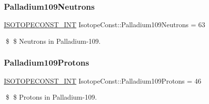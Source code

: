 \subsubsection{\texorpdfstring{Palladium109\+Neutrons}{Palladium109Neutrons}}
{\footnotesize\ttfamily \mbox{\hyperlink{group___isotope_const-_macros_ga5f18360b3e99483a35c32d789e62621c}{I\+S\+O\+T\+O\+P\+E\+C\+O\+N\+S\+T\+\_\+\+I\+NT}} Isotope\+Const\+::\+Palladium109\+Neutrons = 63}

\$ \$ Neutrons in Palladium-\/109. \mbox{\label{group___isotope_const-_palladium-_pd109_ga1af55f224526a0639d94bea9c572cdf7}} 
\subsubsection{\texorpdfstring{Palladium109\+Protons}{Palladium109Protons}}
{\footnotesize\ttfamily \mbox{\hyperlink{group___isotope_const-_macros_ga5f18360b3e99483a35c32d789e62621c}{I\+S\+O\+T\+O\+P\+E\+C\+O\+N\+S\+T\+\_\+\+I\+NT}} Isotope\+Const\+::\+Palladium109\+Protons = 46}

\$ \$ Protons in Palladium-\/109. 